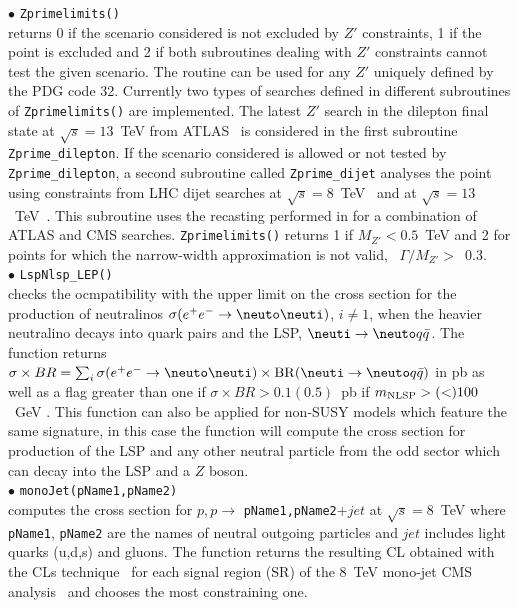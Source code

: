 \documentclass[12pt,a4paper]{article}
\begin{document}
{\noi$\bullet$ \verb|Zprimelimits()|\\
returns 0 if the scenario considered is not excluded by $Z'$ constraints, 1 if the point is excluded and 2 if both subroutines dealing with $Z'$ constraints cannot test the given scenario. The routine can be used for any $Z'$ uniquely defined by the PDG code 32.
Currently two types of searches defined in different subroutines of \verb|Zprimelimits()| are implemented.
The latest $Z'$ search in the dilepton final state at $\sqrt{s} = 13$~TeV from ATLAS~\cite{Aaboud:2016cth} is considered in the first subroutine \verb|Zprime_dilepton|. If the scenario considered is allowed or not tested by \verb|Zprime_dilepton|, a second subroutine called \verb|Zprime_dijet| analyses the point using constraints from LHC dijet searches at $\sqrt{s} = 8$~TeV~\cite{Aad:2014aqa,Khachatryan:2015sja,Khachatryan:2016ecr} and at $\sqrt{s} = 13$~TeV~\cite{ATLAS:2015nsi,Khachatryan:2015dcf}. This subroutine uses the recasting  performed  in \cite{Fairbairn:2016iuf} for a combination of ATLAS and CMS searches.
\verb|Zprimelimits()| returns 1 if $M_{Z'}<0.5$~TeV and  2 for points  for which the narrow-width approximation is not valid, \ie~$\Gamma/M_{Z'}>$~0.3.\\

\noi$\bullet$   \verb|LspNlsp_LEP()|\\
checks  the ocmpatibility with the upper limit \cite{Abbiendi:2003sc} on the cross section for the production of neutralinos 
$\sigma(e^+e^-\rightarrow \neuto\neuti)$, $i\neq 1$, when the heavier neutralino decays into quark pairs 
and the LSP, $\neuti \rightarrow \neuto q\bar{q}$. The function  
 returns $\sigma \times BR = \sum_i \sigma(e^+e^-\rightarrow \neuto\neuti)\times {\rm BR}(\neuti \rightarrow \neuto q\bar{q})$ in pb as well as a flag greater than one if $\sigma \times BR>0.1(0.5)$~pb if $m_{\rm NLSP}> (<)100$~GeV \cite{Abbiendi:2003sc}. 
This function can also be applied for non-SUSY models which feature the same signature, in this case the function will compute the cross section for production of the LSP and any other neutral particle from the odd sector which can decay into the LSP and a $Z$ boson.\\


\noi$\bullet$   \verb|monoJet(pName1,pName2)|\\
computes the cross section for $p,p\rightarrow$ \verb|pName1,pName2|$ +jet$ at $\sqrt{s}=8$~TeV 
where \verb|pName1|, \verb|pName2| are the names of neutral outgoing particles and $jet$ includes light quarks (u,d,s)  and gluons.
The function returns  the resulting  CL  obtained with the CLs technique~\cite{Read:2002hq,Read:2000ru} for each  signal region (SR) of the 8~TeV mono-jet CMS analysis~\cite{Khachatryan:2014rra} and chooses the most constraining one.



}
\end{document}
